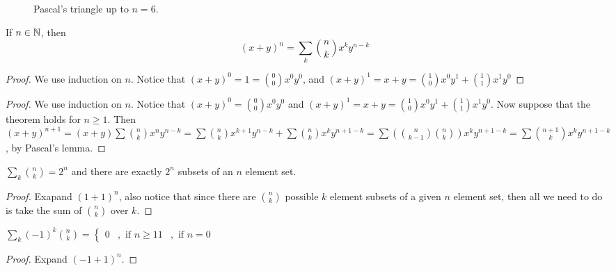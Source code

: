 \begin{figure} 
    \centering
        \caption{Pascal's triangle up to $n=6$.}
        \label{fig:2.1}
\end{figure}

\begin{theorem}\label{2.0.3}
    If $n \in \mathbb{N}$, then
        \begin{equation}
            (x+y)^n=\sum_{k}{\binom{n}{k}x^ky^{n-k}}
        \end{equation} 
\end{theorem}
\begin{proof}
    We use induction on $n$. Notice that  $(x+y)^0=1=\binom{0}{0}x^0y^0$, and
    $(x+y)^1=x+y=\binom{1}{0}x^0y^1+\binom{1}{1}x^1y^0$
\end{proof}
\begin{proof}
    We use induction on $n$. Notice that  $(x+y)^0=\binom{0}{0}x^0y^0$ and
    $(x+y)^1=x+y=\binom{1}{0}x^0y^1+\binom{1}{1}x^1y^0$. Now suppose that the theorem holds for $n
    \geq 1$. Then
    $(x+y)^{n+1}=(x+y)\sum{\binom{n}{k}x^ny^{n-k}}=
    \sum{\binom{n}{k}x^{k+1}y^{n-k}}+\sum{\binom{n}{k}x^ky^{n+1-k}}=\sum{(\binom{n}{k-1}\binom{n}{k})x^ky^{n+1-k}}=
    \sum{\binom{n+1}{k}x^ky^{n+1-k}}$, by Pascal's lemma.
\end{proof}
\begin{corollary}
    $\sum_k{\binom{n}{k}}=2^n$ and there are exactly $2^n$ subsets of an  $n$ element set.		
\end{corollary}
\begin{proof}
    Exapand $(1+1)^n$, also notice that since there are $\binom{n}{k}$ possible $k$ element subsets
    of a given  $n$ element set, then  all we need to do is  take the sum of $\binom{n}{k}$ over
    $k$.
\end{proof}
\begin{corollary}
    $\sum_{k}{(-1)^k\binom{n}{k}}=\begin{cases}
                                    0 & , \text{ if } n \geq 1
                                    1 & , \text{ if } n=0
                                \end{cases}$
\end{corollary}
\begin{proof}
    Expand $(-1+1)^n$.
\end{proof}

